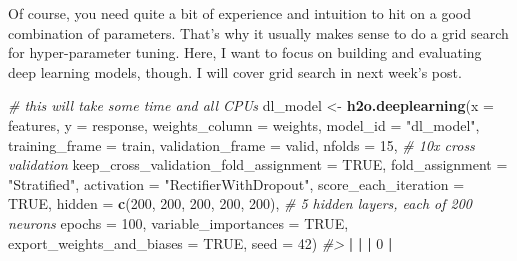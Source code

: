 \documentclass[]{book}
\newenvironment{Shaded}{\begin{snugshade}}{\end{snugshade}}
\newcommand{\CommentTok}[1]{\textcolor[rgb]{0.56,0.35,0.01}{\textit{#1}}}
\newcommand{\DataTypeTok}[1]{\textcolor[rgb]{0.13,0.29,0.53}{#1}}
\newcommand{\DecValTok}[1]{\textcolor[rgb]{0.00,0.00,0.81}{#1}}
\newcommand{\ErrorTok}[1]{\textcolor[rgb]{0.64,0.00,0.00}{\textbf{#1}}}
\newcommand{\KeywordTok}[1]{\textcolor[rgb]{0.13,0.29,0.53}{\textbf{#1}}}
\newcommand{\NormalTok}[1]{#1}
\newcommand{\OperatorTok}[1]{\textcolor[rgb]{0.81,0.36,0.00}{\textbf{#1}}}
\newcommand{\OtherTok}[1]{\textcolor[rgb]{0.56,0.35,0.01}{#1}}
\newcommand{\StringTok}[1]{\textcolor[rgb]{0.31,0.60,0.02}{#1}}
\begin{document}
Of course, you need quite a bit of experience and intuition to hit on a good combination of parameters. That's why it usually makes sense to do a grid search for hyper-parameter tuning. Here, I want to focus on building and evaluating deep learning models, though. I will cover grid search in next week's post.\\

\begin{Shaded}
\begin{Highlighting}[]
\CommentTok{# this will take some time and all CPUs}
\NormalTok{dl_model <-}\StringTok{ }\KeywordTok{h2o.deeplearning}\NormalTok{(}\DataTypeTok{x =}\NormalTok{ features,}
                             \DataTypeTok{y =}\NormalTok{ response,}
                             \DataTypeTok{weights_column =}\NormalTok{ weights,}
                             \DataTypeTok{model_id =} \StringTok{"dl_model"}\NormalTok{,}
                             \DataTypeTok{training_frame =}\NormalTok{ train,}
                             \DataTypeTok{validation_frame =}\NormalTok{ valid,}
                             \DataTypeTok{nfolds =} \DecValTok{15}\NormalTok{,                                   }\CommentTok{# 10x cross validation}
                             \DataTypeTok{keep_cross_validation_fold_assignment =} \OtherTok{TRUE}\NormalTok{,}
                             \DataTypeTok{fold_assignment =} \StringTok{"Stratified"}\NormalTok{,}
                             \DataTypeTok{activation =} \StringTok{"RectifierWithDropout"}\NormalTok{,}
                             \DataTypeTok{score_each_iteration =} \OtherTok{TRUE}\NormalTok{,}
                             \DataTypeTok{hidden =} \KeywordTok{c}\NormalTok{(}\DecValTok{200}\NormalTok{, }\DecValTok{200}\NormalTok{, }\DecValTok{200}\NormalTok{, }\DecValTok{200}\NormalTok{, }\DecValTok{200}\NormalTok{),           }\CommentTok{# 5 hidden layers, each of 200 neurons}
                             \DataTypeTok{epochs =} \DecValTok{100}\NormalTok{,}
                             \DataTypeTok{variable_importances =} \OtherTok{TRUE}\NormalTok{,}
                             \DataTypeTok{export_weights_and_biases =} \OtherTok{TRUE}\NormalTok{,}
                             \DataTypeTok{seed =} \DecValTok{42}\NormalTok{)}
\CommentTok{#> }
  \OperatorTok{|}\StringTok{                                                                       }
\StringTok{  }\ErrorTok{|}\StringTok{                                                                 }\ErrorTok{|}\StringTok{   }\DecValTok{0}\NormalTok{%}
  \OperatorTok{|}\StringTok{                                                                       }
}
\end{Highlighting}
\end{Shaded}
\end{document}
